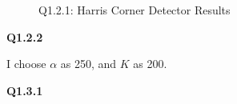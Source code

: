 \documentclass[
  course = {{16-720B Computer Vision}},
  quartile = {{1}},
  assignment = 2-Bag\ of \ Visual\ Words,
  name = {{Kangle Deng}},
  email = {{kangled@andrew.cmu.edu}},
  firstexercise = 1
]{aga-homework}
\begin{document}
\begin{figure}
    \centering
    \caption{Q1.2.1: Harris Corner Detector Results}
    \label{fig:hw2_q121}
\end{figure}

\noindent \textbf{Q1.2.2}

I choose $\alpha$ as 250, and $K$ as 200.

\noindent \textbf{Q1.3.1}
\end{document}
